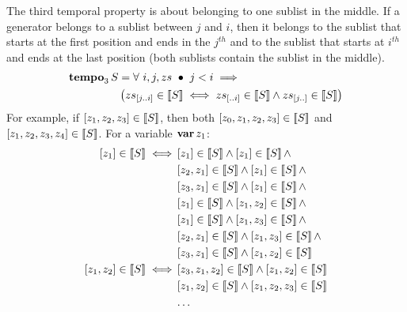 The third temporal property is about belonging to one sublist in the middle.
If a generator belongs to a sublist between $j$ and $i$, then it belongs to the sublist that starts at the first position and ends in the $j^{th}$ and to the sublist that starts at $i^{th}$ and ends at the last position (both sublists contain the sublist in the middle).
%
\begin{align}
\tempo[3]{S} &= \forall~ i, j, zs ~\bullet~
j < i \implies \nonumber\\
&\left(
\slice{zs}{j}{i} \in \denote{S} \iff \sliceright{zs}{i} \in \denote{S} \land \sliceleft{zs}{j} \in \denote{S}
\right)\label{def:tempo3}
\end{align}
%
For example, if $\listsin{z_1,z_2,z_3} \in \denote{S}$, then both $\listsin{z_0,z_1,z_2,z_3} \in \denote{S}$ and $\listsin{z_1,z_2,z_3,z_4} \in \denote{S}$.
For a variable $\var{z_1}$:
%
%
\begin{align}
\listsin{z_1} \in \denote{S} \iff &
  \listsin{z_1} \in \denote{S} \land \listsin{z_1} \in \denote{S}\land\nonumber\\
  & \listsin{z_2,z_1} \in \denote{S} \land \listsin{z_1} \in \denote{S} \land\nonumber\\
  & \listsin{z_3,z_1} \in \denote{S} \land \listsin{z_1} \in \denote{S} \land\nonumber\\
  & \listsin{z_1} \in \denote{S} \land \listsin{z_1,z_2} \in \denote{S} \land\nonumber\\
  & \listsin{z_1} \in \denote{S} \land \listsin{z_1,z_3} \in \denote{S} \land\nonumber\\
  & \listsin{z_2,z_1} \in \denote{S} \land \listsin{z_1,z_3} \in \denote{S}\land\nonumber\\
  & \listsin{z_3,z_1} \in \denote{S} \land \listsin{z_1,z_2} \in \denote{S}\nonumber\\
\listsin{z_1,z_2} \in \denote{S} \iff &
  \listsin{z_3,z_1,z_2} \in \denote{S} \land \listsin{z_1,z_2} \in \denote{S}\nonumber\\
  & \listsin{z_1,z_2} \in \denote{S} \land \listsin{z_1,z_2,z_3} \in \denote{S}\nonumber\\
  & \ldots\nonumber
\end{align}

